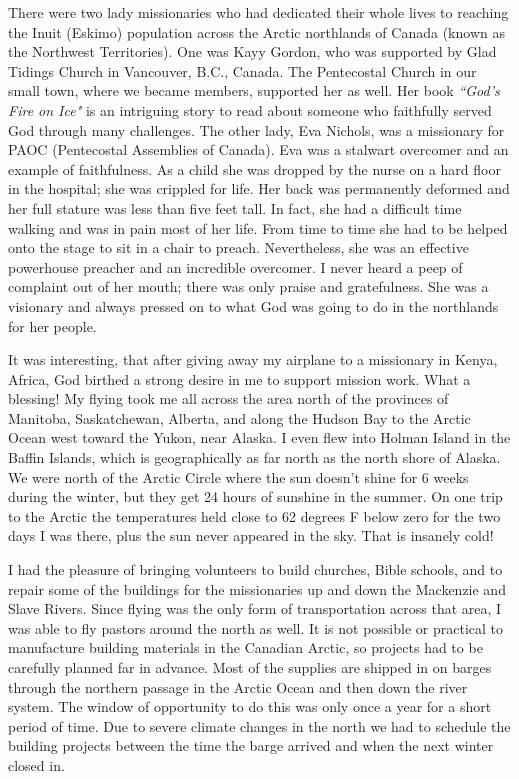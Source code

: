 \documentclass[oneside]{book}
\begin{document}
There were two lady missionaries who had dedicated their whole lives to reaching the Inuit (Eskimo) population across the Arctic northlands of Canada (known as the Northwest Territories). One was Kayy Gordon, who was supported by Glad Tidings Church in Vancouver, B.C., Canada. The Pentecostal Church in our small town, where we became members, supported her as well. Her book \textit{``God's Fire on Ice"} is an intriguing story to read about someone who faithfully served God through many challenges. The other lady, Eva Nichols, was a missionary for PAOC (Pentecostal Assemblies of Canada). Eva was a stalwart overcomer and an example of faithfulness. As a child she was dropped by the nurse on a hard floor in the hospital; she was crippled for life. Her back was permanently deformed and her full stature was less than five feet tall. In fact, she had a difficult time walking and was in pain most of her life. From time to time she had to be helped onto the stage to sit in a chair to preach. Nevertheless, she was an effective powerhouse preacher and an incredible overcomer. I never heard a peep of complaint out of her mouth; there was only praise and gratefulness. She was a visionary and always pressed on to what God was going to do in the northlands for her people.

It was interesting, that after giving away my airplane to a missionary in Kenya, Africa, God birthed a strong desire in me to support mission work. What a blessing! My flying took me all across the area north of the provinces of Manitoba, Saskatchewan, Alberta, and along the Hudson Bay to the Arctic Ocean west toward the Yukon, near Alaska. I even flew into Holman Island in the Baffin Islands, which is geographically as far north as the north shore of Alaska. We were north of the Arctic Circle where the sun doesn't shine for 6 weeks during the winter, but they get 24 hours of sunshine in the summer. On one trip to the Arctic the temperatures held close to 62 degrees F below zero for the two days I was there, plus the sun never appeared in the sky. That is insanely cold!

I had the pleasure of bringing volunteers to build churches, Bible schools, and to repair some of the buildings for the missionaries up and down the Mackenzie and Slave Rivers. Since flying was the only form of transportation across that area, I was able to fly pastors around the north as well. It is not possible or practical to manufacture building materials in the Canadian Arctic, so projects had to be carefully planned far in advance. Most of the supplies are shipped in on barges through the northern passage in the Arctic Ocean and then down the river system. The window of opportunity to do this was only once a year for a short period of time. Due to severe climate changes in the north we had to schedule the building projects between the time the barge arrived and when the next winter closed in.
\end{document}
